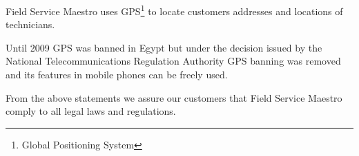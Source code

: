 Field Service Maestro uses GPS\footnote{Global Positioning System} to locate customers addresses and locations of technicians.

Until 2009 GPS was banned in Egypt but under the decision issued by the National Telecommunications Regulation Authority GPS banning was removed and its features in mobile phones can be freely used.\cite{gps_remove_ban}

From the above statements we assure our customers that Field Service Maestro comply to all legal laws and regulations.